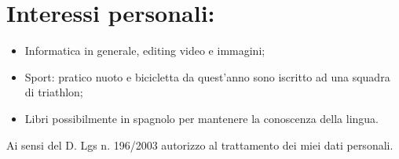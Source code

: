 \documentclass[pdftex,a4paper,10pt,twoside,titlepage,italian]{article}
\begin{document}
\section*{Interessi personali: }
\begin{itemize}
	\item Informatica in generale, editing video e immagini;
	\item Sport: pratico nuoto e bicicletta da quest'anno sono iscritto ad una squadra di triathlon;
	\item Libri possibilmente in spagnolo per mantenere la conoscenza della lingua.
\end{itemize}
\vfill
Ai sensi del D. Lgs n. 196/2003 autorizzo al trattamento dei miei dati personali.
\vspace{1cm}
\end{document}
